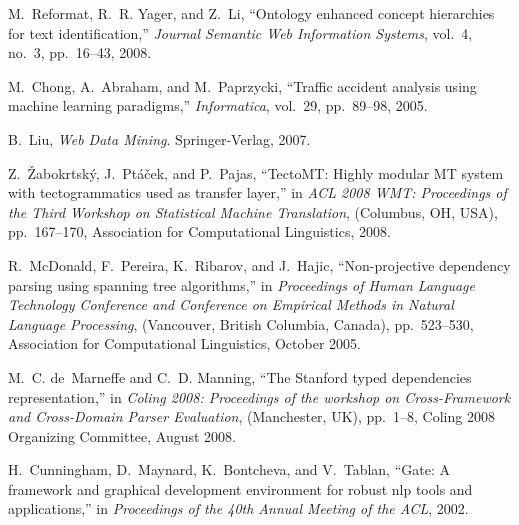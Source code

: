 \begin{thebibliography}{10}
M.~Reformat, R.~R. Yager, and Z.~Li, ``Ontology enhanced concept hierarchies
  for text identification,'' {\em Journal Semantic Web Information Systems},
  vol.~4, no.~3, pp.~16--43, 2008.

M.~Chong, A.~Abraham, and M.~Paprzycki, ``Traffic accident analysis using
  machine learning paradigms,'' {\em Informatica}, vol.~29, pp.~89--98, 2005.

B.~Liu, {\em Web Data Mining}.
\newblock Springer-Verlag, 2007.

Z.~{\v{Z}}abokrtsk{\'{y}}, J.~Pt{\'{a}}{\v{c}}ek, and P.~Pajas, ``Tecto{MT}:
  Highly modular {MT} system with tectogrammatics used as transfer layer,'' in
  {\em {ACL} 2008 {WMT}: Proceedings of the Third Workshop on Statistical
  Machine Translation}, (Columbus, {OH}, {USA}), pp.~167--170, Association for
  Computational Linguistics, 2008.

R.~McDonald, F.~Pereira, K.~Ribarov, and J.~Hajic, ``Non-projective dependency
  parsing using spanning tree algorithms,'' in {\em Proceedings of Human
  Language Technology Conference and Conference on Empirical Methods in Natural
  Language Processing}, (Vancouver, British Columbia, Canada), pp.~523--530,
  Association for Computational Linguistics, October 2005.

M.~C. de~Marneffe and C.~D. Manning, ``The {S}tanford typed dependencies
  representation,'' in {\em Coling 2008: Proceedings of the workshop on
  Cross-Framework and Cross-Domain Parser Evaluation}, (Manchester, UK),
  pp.~1--8, Coling 2008 Organizing Committee, August 2008.

H.~Cunningham, D.~Maynard, K.~Bontcheva, and V.~Tablan, ``Gate: A framework and
  graphical development environment for robust nlp tools and applications,'' in
  {\em Proceedings of the 40th Annual Meeting of the ACL}, 2002.

\end{thebibliography}
